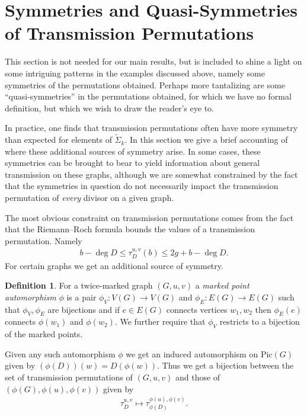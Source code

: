 \documentclass[11pt]{article}
\theoremstyle{definition}
\newtheorem{defi}[theo]{Definition}
\numberwithin{equation}{section}
\newcommand{\pic}[1]{\mathrm{Pic}\left({#1}\right)}
\newcommand{\eaf}[1]{\widetilde{\Sigma}_{#1}}
\newcommand{\tauD}{\tau^{u,v}_D}
\begin{document}
\section{Symmetries and Quasi-Symmetries of Transmission Permutations}\label{ssec:mpAutos}

This section is not needed for our main results, but is included to shine a light on some intriguing patterns in the examples discussed above, namely some symmetries of the permutations obtained. Perhaps more tantalizing are some ``quasi-symmetries'' in the permutations obtained, for which we have no formal definition, but which we wish to draw the reader's eye to.

In practice, one finds that transmission permutations often have more symmetry than expected for elements of $\eaf{k}$. In this section we give a brief accounting of where these additional sources of symmetry arise. In some cases, these symmetries can be brought to bear to yield information about general transmission on these graphs, although we are somewhat constrained by the fact that the symmetries in question do not necessarily impact the transmission permutation of \textit{every} divisor on a given graph.

The most obvious constraint on transmission permutations comes from the fact that the Riemann--Roch formula bounds the values of a transmission permutation. Namely
\begin{align}\label{eq-RRTauBounds}
    b-\deg D \leq \tauD(b) \leq 2g +b-\deg D.
\end{align}
For certain graphs we get an additional source of symmetry.

\begin{defi}
    For a twice-marked graph $(G,u,v)$ a \textit{marked point automorphism} $\phi$ is a pair $\phi_V:V(G)\to V(G)$ and $\phi_E:E(G)\to E(G)$ such that $\phi_V,\phi_E$ are bijections and if $e \in E(G)$ connects vertices $w_1,w_2$ then $\phi_E(e)$ connects $\phi(w_1)$ and $\phi(w_2)$. We further require that $\phi_V$ restricts to a bijection of the marked points.
\end{defi}

Given any such automorphism $\phi$ we get an induced automorphism on $\pic{G}$ given by $(\phi(D))(w) = D(\phi(w))$. Thus we get a bijection between the set of transmission permutations of $(G,u,v)$ and those of $(\phi(G),\phi(u),\phi(v))$ given by
\begin{align*}
    \tauD \mapsto \tau_{\phi(D)}^{\phi(u),\phi(v)}.
\end{align*}
\end{document}
